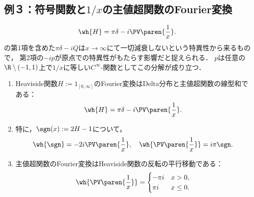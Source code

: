 \documentclass[uplatex,dvipdfmx]{jsreport}
\begin{document}
\subsection{例３：符号関数と$1/x$の主値超関数のFourier変換}

\begin{tcolorbox}[colframe=ForestGreen, colback=ForestGreen!10!white,breakable,colbacktitle=ForestGreen!40!white,coltitle=black,fonttitle=\bfseries\sffamily,
title=]
    \[\wh{H}=\pi\delta-i\PV\paren{\frac{1}{x}}.\]
    の第1項を含めた$\pi\delta-iQ$は$x\to\infty$にて一切減衰しないという特異性から来るもので，
    第2項の$-ip$が原点での特異性がもたらす影響だと捉えられる．
    $p$は任意の$\R\setminus(-1,1)$上で$1/x$に等しい$C^\infty$-関数としてこの分解が成り立つ．
\end{tcolorbox}

\begin{example}\mbox{}
    \begin{enumerate}
        \item Heaviside関数$H:=1_{[0,\infty]}$のFourier変換はDelta分布と主値超関数の線型和である：
        \[\wh{H}=\pi\delta-i\PV\paren{\frac{1}{x}}.\]
        \item 特に，$\sgn(x):=2H-1$について，
        \[\wh{\sgn}=-2i\PV\paren{\frac{1}{x}},\quad \wh{\PV\paren{\frac{1}{x}}}=i\pi\sgn.\]
        \item 主値超関数のFourier変換はHeaviside関数の反転の平行移動である：
        \[\wh{\PV\paren{\frac{1}{x}}}=\begin{cases}
            -\pi i&x>0,\\
            \pi i&x\le 0.
        \end{cases}\]
    \end{enumerate}
\end{example}
\end{document}
